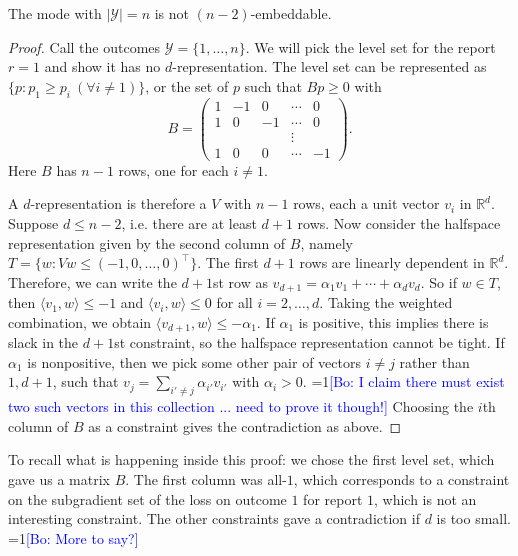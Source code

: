 \documentclass[anon,12pt]{colt2019}
\newcommand{\Comments}{1}
\newcommand{\mynote}[2]{\ifnum\Comments=1\textcolor{#1}{#2}\fi}
\newcommand{\bo}[1]{\mynote{blue}{[Bo: #1]}}
\newcommand{\reals}{\mathbb{R}}
\newcommand{\Y}{\mathcal{Y}}
\begin{document}
\begin{theorem}[\bo{cite}]
  The mode with $|\Y|=n$ is not $(n-2)$-embeddable.
\end{theorem}
\begin{proof}
  Call the outcomes $\Y = \{1,\dots,n\}$.
  We will pick the level set for the report $r=1$ and show it has no $d$-representation.
  The level set can be represented as $\{p : p_1 \geq p_i ~ (\forall i \neq 1)\}$, or the set of $p$ such that $Bp \geq 0$ with
  \[ B = \begin{pmatrix}
       1  & -1 &  0 & \cdots & 0  \\
       1  &  0 & -1 & \cdots & 0  \\
          &    &    & \vdots &    \\
       1  &  0 &  0 & \cdots & -1
     \end{pmatrix} .
  \]
  Here $B$ has $n-1$ rows, one for each $i \neq 1$.

  A $d$-representation is therefore a $V$ with $n-1$ rows, each a unit vector $v_i$ in $\reals^d$.
  Suppose $d \leq n-2$, i.e. there are at least $d+1$ rows.
  Now consider the halfspace representation given by the second column of $B$, namely $T = \{ w : Vw \leq (-1, 0, \dots, 0)^{\intercal}\}$.
  The first $d+1$ rows are linearly dependent in $\reals^d$.
  Therefore, we can write the $d+1$st row as $v_{d+1} = \alpha_1 v_1 + \cdots + \alpha_d v_d$.
  So if $w \in T$, then $\langle v_1,w \rangle \leq -1$ and $\langle v_i,w \rangle \leq 0$ for all $i=2,\dots,d$.
  Taking the weighted combination, we obtain $\langle v_{d+1}, w \rangle \leq -\alpha_1$.
  If $\alpha_1$ is positive, this implies there is slack in the $d+1$st constraint, so the halfspace representation cannot be tight.
  If $\alpha_1$ is nonpositive, then we pick some other pair of vectors $i \neq j$ rather than $1,d+1$, such that $v_j = \sum_{i'\neq j} \alpha_{i'} v_{i'}$ with $\alpha_i > 0$.
  \bo{I claim there must exist two such vectors in this collection ... need to prove it though!}
  Choosing the $i$th column of $B$ as a constraint gives the contradiction as above.
\end{proof}
To recall what is happening inside this proof: we chose the first level set, which gave us a matrix $B$.
The first column was all-$1$, which corresponds to a constraint on the subgradient set of the loss on outcome $1$ for report $1$, which is not an interesting constraint.
The other constraints gave a contradiction if $d$ is too small.
\bo{More to say?}
\end{document}
